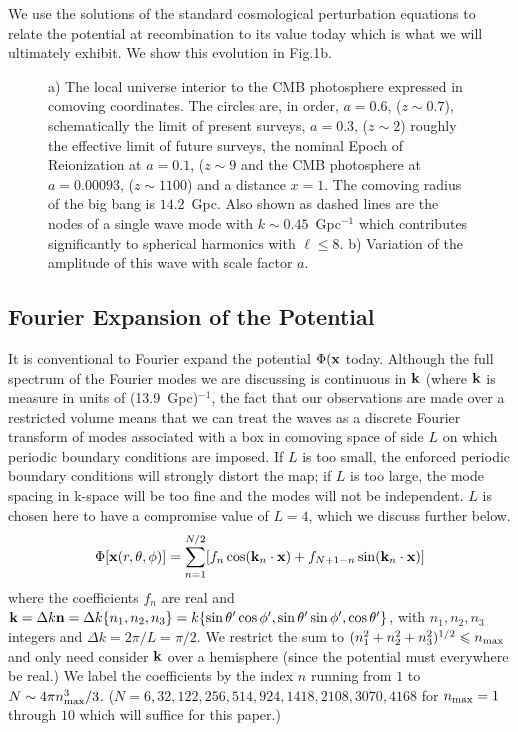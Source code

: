 \documentclass[useAMS,usenatbib,a4paper]{mn2e}
\begin{document}
We use the solutions of the standard cosmological perturbation
equations to relate the potential at recombination to its value today
which is what we will ultimately exhibit. We show this evolution in
Fig.1b.
\begin{figure}[t]
\centering
\caption{\small{a) The local universe interior to the CMB photosphere expressed in comoving coordinates. The circles are, in order, $a=0.6$, ($z\sim0.7$), schematically the limit of present surveys, $a=0.3$, ($z\sim2$) roughly the effective limit of future surveys, the nominal Epoch of Reionization at $a=0.1$, ($z\sim9$ and the CMB photosphere at $a=0.00093$, ($z\sim1100$) and a distance $x=1$. The comoving radius of the big bang is $14.2$~Gpc. Also shown as dashed lines are the nodes of a single wave mode with $k\sim0.45$~Gpc$^{-1}$ which contributes significantly to spherical harmonics with $\ell\leq8$. b) Variation of the amplitude of this wave with scale factor $a$.}}
\end{figure}

\subsection{Fourier Expansion of the Potential}

It is conventional to Fourier expand the potential $\Phi({\bf x}$
today. Although the full spectrum of the Fourier modes we are
discussing is continuous in ${\bf k}$ (where $\bf k$ is measure in
units of (13.9~Gpc)$^{-1}$, the fact that our observations are made
over a restricted volume means that we can treat the waves as a
discrete Fourier transform of modes associated with a box in comoving
space of side $L$ on which periodic boundary conditions are imposed.
If $L$ is too small, the enforced periodic boundary conditions will
strongly distort the map; if $L$ is too large, the mode spacing in
k-space will be too fine and the modes will not be independent. $L$ is
chosen here to have a compromise value of $L=4$, which we discuss
further below.
\begin{equation}
\Phi[{\bf x}(r,\theta,\phi)]=\sum_{n=1}^{N/2}[f_n\cos({\bf k}_n\cdot{\bf x})+f_{N+1-n}\sin({\bf k}_n\cdot{\bf x})]
\end{equation}
where the coefficients $f_n$ are real and ${\bf k}=\Delta k{\bf
n}=\Delta
k\{n_1,n_2,n_3\}=k\{\sin\theta'\cos\phi',\sin\theta'\sin\phi',\cos\theta'\}$,
with $n_1,n_2,n_3$ integers and $\Delta k=2\pi/L=\pi/2$.  We restrict
the sum to $(n_1^2+n_2^2+n_3^2)^{1/2}\le n_{\rm max}$ and only need
consider $\bf k$ over a hemisphere (since the potential must
everywhere be real.) We label the coefficients by the index $n$
running from $1$ to $N\sim4\pi n_{\rm max}^3/3$.
($N=6,32,122,256,514,924,1418,2108,3070,4168$ for $n_{\rm max}=1$
through $10$ which will suffice for this paper.)
\end{document}
